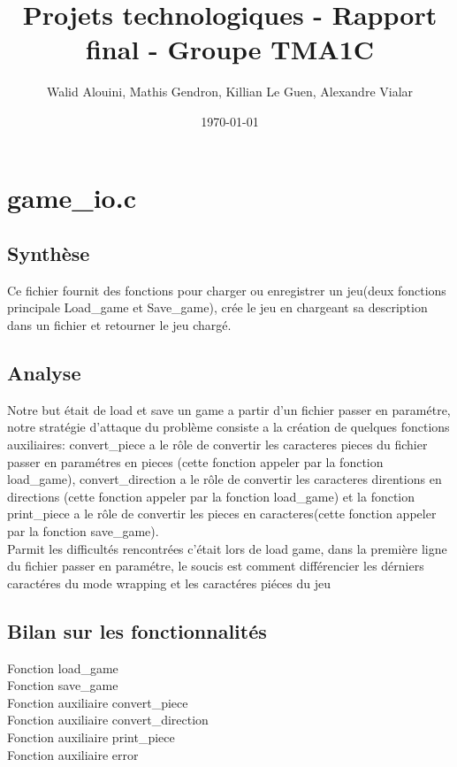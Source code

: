 \documentclass[12pt]{article}
\begin{document}
\title{Projets technologiques - Rapport final - Groupe TMA1C}
\author{Walid Alouini, Mathis Gendron, Killian Le Guen, Alexandre Vialar}
\date{\today}

\maketitle

\tableofcontents

\section{game\_io.c}
\subsection{Synthèse}
Ce fichier fournit des fonctions pour charger ou enregistrer un jeu(deux fonctions principale Load\_game et Save\_game), crée le jeu en chargeant sa description dans un fichier et retourner le jeu chargé.
\subsection{Analyse}
Notre but était de load et save un game a partir d'un fichier passer en paramétre, notre stratégie d'attaque du problème consiste a la création de quelques fonctions auxiliaires: convert\_piece a le rôle de convertir les caracteres pieces du fichier passer en paramétres en pieces (cette fonction appeler par la fonction load\_game), convert\_direction a le rôle de convertir les caracteres direntions en directions (cette fonction appeler par la fonction load\_game) et la fonction print\_piece a le rôle de convertir les pieces en caracteres(cette fonction appeler par la fonction save\_game).\\
Parmit les difficultés rencontrées c'était lors de load game, dans la première ligne du fichier passer en paramétre, le soucis est comment différencier les dérniers caractéres du mode wrapping et les caractéres piéces du jeu
\subsection{Bilan sur les fonctionnalités}
Fonction load\_game\\ 
Fonction save\_game\\ 
Fonction auxiliaire convert\_piece\\ 
Fonction auxiliaire convert\_direction\\ 
Fonction auxiliaire print\_piece\\ 
Fonction auxiliaire error\\ 
\end{document}
